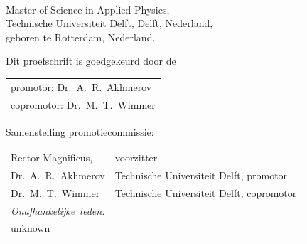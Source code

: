 \begin{titlepage}
\begin{center}
\makeatletter
{\Large\titlefont\bfseries\@firstname\ {\titleshape\@lastname}}
\makeatother

\bigskip
\bigskip

Master of Science in Applied Physics, \\
Technische Universiteit Delft, Delft, Nederland, \\
geboren te Rotterdam, Nederland.

\vspace*{2\bigskipamount}

\end{center}

\clearpage
\thispagestyle{empty}

\noindent Dit proefschrift is goedgekeurd door de

\medskip\noindent
\begin{tabular}{l}
    promotor:  Dr.\ A.\ R.\ Akhmerov \\
    copromotor: Dr.\ M.\ T.\ Wimmer
\end{tabular}

\bigskip
\noindent Samenstelling promotiecommissie:

\medskip\noindent
\begin{tabular}{p{4cm}l}
    Rector Magnificus, & voorzitter \\
    Dr.\ A.\ R.\ Akhmerov & Technische Universiteit Delft, promotor \\
    Dr.\ M.\ T.\ Wimmer & Technische Universiteit Delft, copromotor \\

    \medskip
    \mbox{\emph{Onafhankelijke leden:}} & \\
    unknown



\end{tabular}
\end{titlepage}
